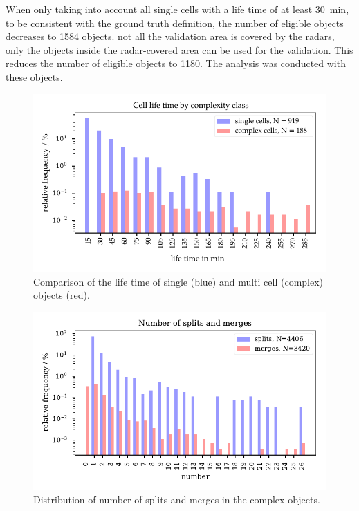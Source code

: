 When only taking into account all single cells with a life time of at least \SI{30}{\minute}, to be consistent with the ground truth definition, the number of eligible objects decreases to \num{1584} objects.  not all the validation area is covered by the radars,  only the objects inside the radar-covered area can be used for the validation. This reduces the number of eligible objects  to 1180. The  analysis was conducted with these objects.

\begin{figure}[htbp]
\centering
\includegraphics[width=\textwidth]{Grafiken/Abbildungen/cellclass_lifetime.pdf}
\caption{Comparison of the life time of single (blue) and multi cell (complex) objects (red).}
\label{fig:cell_ltime}
\end{figure}

\begin{figure}[htbp]
\centering
\includegraphics[width=\textwidth]{Grafiken/Abbildungen/splits_merges.pdf}
\caption{Distribution of number of splits and merges in the complex objects.}
\label{fig:splits_merges}
\end{figure}

